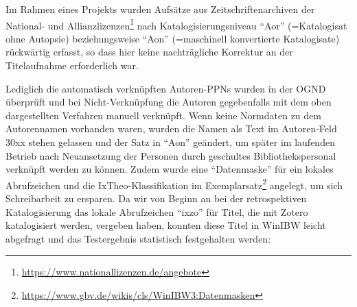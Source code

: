 \documentclass[a4paper,
fontsize=11pt,
oneside,
numbers=noperiodatend,
parskip=half-,
bibliography=totoc,
final
]{scrartcl}
\begin{document}
Im Rahmen eines Projekts wurden Aufsätze aus Zeitschriftenarchiven der
National- und Allianzlizenzen\footnote{\url{https://www.nationallizenzen.de/angebote}}
nach Katalogisierungsniveau \enquote{Aor} (=Katalogisat ohne Autopsie)
beziehungsweise \enquote{Aon} (=maschinell konvertierte Katalogisate)
rückwärtig erfasst, so dass hier keine nachträgliche Korrektur an der
Titelaufnahme erforderlich war.

Lediglich die automatisch verknüpften Autoren-PPNs wurden in der OGND
überprüft und bei Nicht-Verknüpfung die Autoren gegebenfalls mit dem
oben dargestellten Verfahren manuell verknüpft. Wenn keine Normdaten zu
dem Autorennamen vorhanden waren, wurden die Namen als Text im
Autoren-Feld 30xx stehen gelassen und der Satz in \enquote{Aon}
geändert, um später im laufenden Betrieb nach Neuansetzung der Personen
durch geschultes Bibliothekspersonal verknüpft werden zu können. Zudem
wurde eine \enquote{Datenmaske} für ein lokales Abrufzeichen und die
IxTheo-Klassifikation im Exemplarsatz\footnote{\url{https://www.gbv.de/wikis/cls/WinIBW3:Datenmasken}}
angelegt, um sich Schreibarbeit zu ersparen. Da wir von Beginn an bei
der retrospektiven Katalogisierung das lokale Abrufzeichen
\enquote{ixzo} für Titel, die mit Zotero katalogisiert werden, vergeben
haben, konnten diese Titel in WinIBW leicht abgefragt und das
Testergebnis statistisch festgehalten werden:
\end{document}
